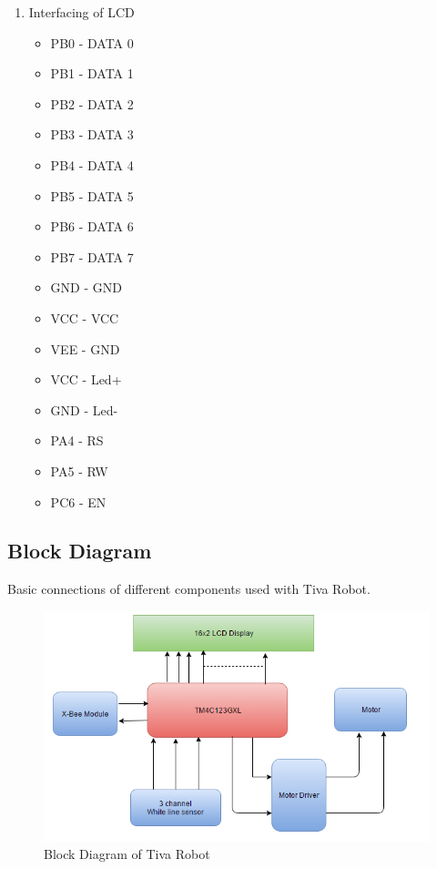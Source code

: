 \documentclass[a4paper,12pt,oneside]{book}
\begin{document}
\begin {enumerate}
\begin{itemize}
\item GND  - GND
\end{itemize}
\item Interfacing of LCD
\begin{itemize}
\item PB0  - DATA 0
\item PB1  - DATA 1
\item PB2  - DATA 2
\item PB3  - DATA 3
\item PB4  - DATA 4
\item PB5  - DATA 5
\item PB6  - DATA 6
\item PB7  - DATA 7
\item GND  - GND
\item VCC  - VCC
\item VEE  - GND
\item VCC  - Led+
\item GND  - Led-
\item PA4  - RS
\item PA5  - RW
\item PC6  - EN
\end{itemize}
\end{enumerate}
\newpage
\subsection*{Block Diagram}
Basic connections of different components used with Tiva Robot.
\\
\begin{figure}[h]
        \centering
        \includegraphics[scale=0.9]{Block}
        \caption{Block Diagram of Tiva Robot}
      \end{figure}
      \newpage
\end{document}
